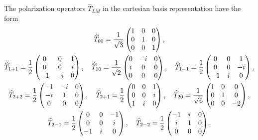 The polarization operators $\widehat{T}_{L M}$ in the cartesian basis representation have the form
\begin{gather}
\widehat{T}_{00}=\frac{1}{\sqrt{3}}\begin{pmatrix}
1 & 0 & 0 \\
0 & 1 & 0 \\
0 & 0 & 1
\end{pmatrix},  \label{eq:2:6:31}\\
\widehat{T}_{1+1}=\frac{1}{2}\begin{pmatrix}
0 & 0 & 1 \\
0 & 0 & i \\
-1 & -i & 0
\end{pmatrix}, \quad \widehat{T}_{10}=\frac{1}{\sqrt{2}}\begin{pmatrix}
0 & -i & 0 \\
i & 0 & 0 \\
0 & 0 & 0
\end{pmatrix}, \quad \widehat{T}_{1-1}=\frac{1}{2}\begin{pmatrix}
0 & 0 & 1 \\
0 & 0 & -i \\
-1 & i & 0
\end{pmatrix},   \label{eq:2:6:32}\\
\widehat{T}_{2+2}=\frac{1}{2}\begin{pmatrix}
-1 & -i & 0 \\
-i & 1 & 0 \\
0 & 0 & 0
\end{pmatrix}, \quad \widehat{T}_{2+1}=\frac{1}{2}\begin{pmatrix}
0 & 0 & 1 \\
0 & 0 & i \\
1 & i & 0
\end{pmatrix}, \quad \widehat{T}_{20}=\frac{1}{\sqrt{6}}\begin{pmatrix}
1 & 0 & 0 \\
0 & 1 & 0 \\
0 & 0 & -2
\end{pmatrix}, \notag\\
\widehat{T}_{2-1}=\frac{1}{2}\begin{pmatrix}
0 & 0 & -1 \\
0 & 0 & i \\
-1 & i & 0
\end{pmatrix}, \quad \widehat{T}_{2-2}=\frac{1}{2}\begin{pmatrix}
-1 & i & 0 \\
i & 1 & 0 \\
0 & 0 & 0
\end{pmatrix} . \label{eq:2:6:33}
\end{gather}
